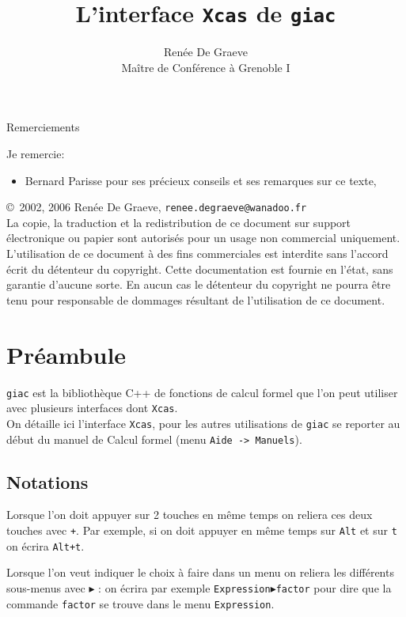 \documentclass[a4paper,11pt]{article}
\title {L'interface {\tt Xcas} de {\tt giac}}
\author{Ren\'ee De Graeve\\ Ma\^itre de Conf\'erence \`a Grenoble I}
\date{}
\begin{document}
\newcommand{\asinh}{\,\,\mbox{asinh\,}}
\newcommand{\atanh}{\,\,\mbox{atanh\,}}
\maketitle


\vfill
{\bf \centerline{Remerciements}}
Je  remercie:
 \begin{itemize}
\item Bernard Parisse pour ses pr\'ecieux conseils et ses remarques sur ce texte,

 \end{itemize}

\vspace{1cm}


\copyright\ 2002, 2006 Ren\'ee De Graeve, \verb|renee.degraeve@wanadoo.fr|\\
La copie, la traduction et la redistribution de ce document sur
support \'electronique
ou papier sont autoris\'es pour un usage non commercial uniquement.
L'utilisation de ce document \`a des fins commerciales est interdite
sans l'accord \'ecrit du d\'etenteur du copyright.
Cette documentation est fournie en l'\'etat, sans garantie d'aucune
sorte. En aucun cas le d\'etenteur du copyright ne pourra \^etre tenu
pour responsable de dommages r\'esultant de l'utilisation de ce
document.
\newpage
\printindex
\newpage
\tableofcontents
\newpage 
\section*{Pr\'eambule}
{\tt giac} est la biblioth\`eque C++ de fonctions de calcul formel que l'on 
peut utiliser  avec plusieurs interfaces dont {\tt Xcas}.\\
On d\'etaille ici l'interface  {\tt Xcas}, pour les autres utilisations de 
{\tt giac} se reporter au d\'ebut du manuel de Calcul formel (menu 
{\tt Aide -> Manuels}).
\subsection{Notations}
Lorsque l'on doit appuyer sur 2 touches en m\^eme temps on reliera ces deux 
touches avec  {\tt +}. Par exemple, si on doit appuyer en m\^eme temps sur
{\tt Alt} et sur {\tt t} on \'ecrira {\tt Alt+t}.

Lorsque l'on veut indiquer le choix \`a faire dans un menu on reliera les 
diff\'erents sous-menus avec $\blacktriangleright$ : on \'ecrira par exemple
{\tt Expression}$\blacktriangleright${\tt factor} pour dire que la commande 
{\tt factor} se trouve dans le menu {\tt Expression}.
\end{document}
